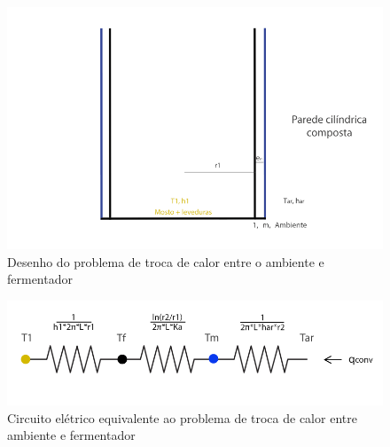 \begin{figure}[h]
    \centering
    \includegraphics[scale=0.35]{figuras/projeto/controle/fermentador_controle.png}
    \caption{Desenho do problema de troca de calor entre o ambiente e fermentador}
    \label{fig:fermentador_controle}
\end{figure}

\begin{figure}[h]
    \centering
    \includegraphics[scale=0.40]{figuras/projeto/controle/fermentador_circuito.png}
    \caption{Circuito elétrico equivalente ao problema de troca de calor entre ambiente e fermentador}
    \label{fig:fermentador_circuito}
\end{figure}


